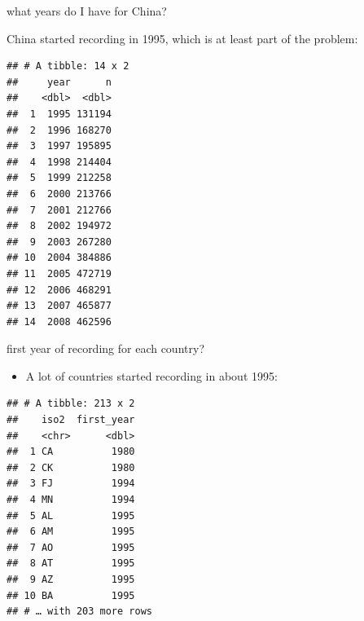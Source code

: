 \documentclass[
  ignorenonframetext,
]{beamer}
\newenvironment{Shaded}{\begin{snugshade}}{\end{snugshade}}
\newcommand{\DataTypeTok}[1]{\textcolor[rgb]{0.13,0.29,0.53}{#1}}
\newcommand{\KeywordTok}[1]{\textcolor[rgb]{0.13,0.29,0.53}{\textbf{#1}}}
\newcommand{\NormalTok}[1]{#1}
\newcommand{\OperatorTok}[1]{\textcolor[rgb]{0.81,0.36,0.00}{\textbf{#1}}}
\newcommand{\StringTok}[1]{\textcolor[rgb]{0.31,0.60,0.02}{#1}}
\providecommand{\tightlist}{%
  \setlength{\itemsep}{0pt}\setlength{\parskip}{0pt}}
\begin{document}
\begin{frame}[fragile]{what years do I have for China?}
\protect\hypertarget{what-years-do-i-have-for-china}{}

China started recording in 1995, which is at least part of the problem:

\begin{Shaded}
\end{Shaded}

\begin{verbatim}
## # A tibble: 14 x 2
##     year      n
##    <dbl>  <dbl>
##  1  1995 131194
##  2  1996 168270
##  3  1997 195895
##  4  1998 214404
##  5  1999 212258
##  6  2000 213766
##  7  2001 212766
##  8  2002 194972
##  9  2003 267280
## 10  2004 384886
## 11  2005 472719
## 12  2006 468291
## 13  2007 465877
## 14  2008 462596
\end{verbatim}

\end{frame}

\begin{frame}[fragile]{first year of recording for each country?}
\protect\hypertarget{first-year-of-recording-for-each-country}{}

\begin{itemize}
\tightlist
\item
  A lot of countries started recording in about 1995:
\end{itemize}

\begin{Shaded}
\end{Shaded}

\begin{verbatim}
## # A tibble: 213 x 2
##    iso2  first_year
##    <chr>      <dbl>
##  1 CA          1980
##  2 CK          1980
##  3 FJ          1994
##  4 MN          1994
##  5 AL          1995
##  6 AM          1995
##  7 AO          1995
##  8 AT          1995
##  9 AZ          1995
## 10 BA          1995
## # … with 203 more rows
\end{verbatim}

\end{frame}
\end{document}

